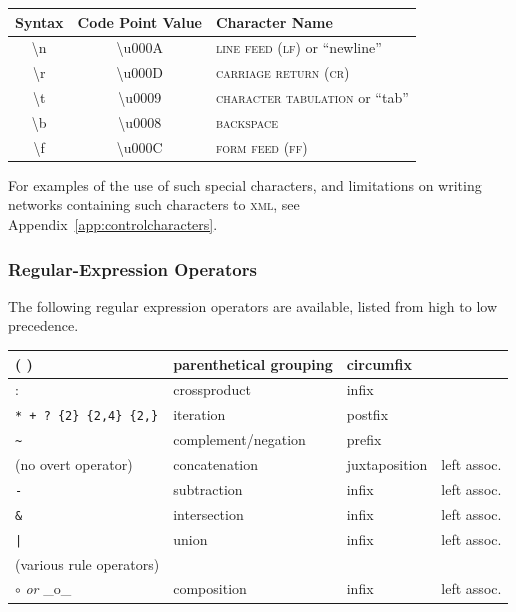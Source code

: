 \documentclass[letterpaper,12pt]{article}
\newcommand{\acro}{\textsc}
\begin{document}
\begin{center}
\begin{tabular}{|c|c|l|}
\hline
\textbf{Syntax} & \textbf{Code Point Value} & \textbf{Character Name} \\
\hline
\hline
\textbackslash{}n & \textbackslash{}u000A & \acro{line feed} (\acro{lf}) or
``newline''\\
\hline
\textbackslash{}r & \textbackslash{}u000D & \acro{carriage return} (\acro{cr})\\
\hline
\textbackslash{}t & \textbackslash{}u0009 & \acro{character tabulation} or
``tab''\\
\hline
\textbackslash{}b & \textbackslash{}u0008 & \acro{backspace} \\
\hline
\textbackslash{}f & \textbackslash{}u000C & \acro{form feed} (\acro{ff}) \\

\hline
\end{tabular}
\end{center}

\vspace{0.5cm}

\noindent
For examples of the use of such special characters, and limitations on writing networks
containing such characters to \acro{xml}, see
Appendix~\ref{app:controlcharacters}.

\subsubsection{Regular-Expression Operators}

The following regular expression operators are available, 
listed from high to low precedence.

\vspace{0.5cm}

\noindent
\begin{tabular}{|l|l|l|l|}
\hline
( ) &  parenthetical grouping & circumfix &\\
\hline
: & crossproduct & infix &\\
\hline
\verb!* + ? {2} {2,4} {2,}! & iteration & postfix &\\
\hline
\verb!~!  & complement/negation & prefix & \\
\hline
(no overt operator) & concatenation & juxtaposition & left assoc.\\
\hline
\verb!-! & subtraction  & infix & left assoc.\\
\hline
\verb!&! & intersection & infix & left assoc.\\
\hline
\verb!|! & union        & infix & left assoc.\\
\hline
(various rule operators) & & &\\
\hline
$\circ$ \emph{or} \_o\_  & composition & infix & left assoc.\\
\hline
\end{tabular}
\end{document}
